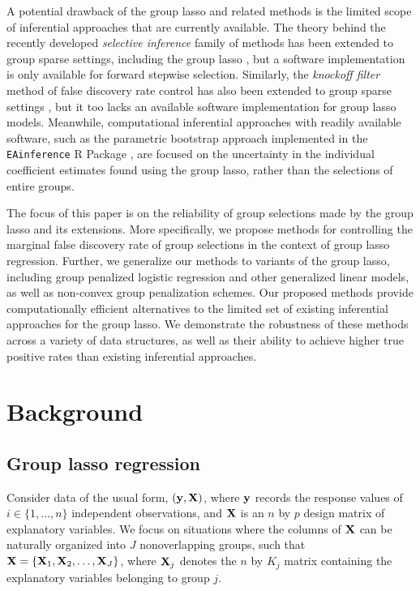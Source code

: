 A potential drawback of the group lasso and related methods is the limited scope of inferential approaches that are currently available. The theory behind the recently developed \textit{selective inference} \citep{Selective_Inference} family of methods has been extended to group sparse settings, including the group lasso \citep{Yang2016}, but a software implementation is only available for forward stepwise selection.  Similarly, the \textit{knockoff filter} method of false discovery rate control \citep{barber2015, candes2018} has also been extended to group sparse settings \citep{Dai2016}, but it too lacks an available software implementation for group lasso models.  Meanwhile, computational inferential approaches with readily available software, such as the parametric bootstrap approach implemented in the {\tt EAinference} R Package \citep{Zhou2017}, are focused on the uncertainty in the individual coefficient estimates found using the group lasso, rather than the selections of entire groups.

The focus of this paper is on the reliability of group selections made by the group lasso and its extensions.  More specifically, we propose methods for controlling the marginal false discovery rate of group selections in the context of group lasso regression.   Further, we generalize our methods to variants of the group lasso, including group penalized logistic regression and other generalized linear models, as well as non-convex group penalization schemes.  Our proposed methods provide computationally efficient alternatives to the limited set of existing inferential approaches for the group lasso.  We demonstrate the robustness of these methods across a variety of data structures, as well as their ability to achieve higher true positive rates than existing inferential approaches. 

\section{Background}

\subsection{Group lasso regression}

Consider data of the usual form, $(\mathbf{y}, \mathbf{X})$, where $\mathbf{y}$ records the response values of $i \in \{1, \ldots, n\}$ independent observations, and $\mathbf{X}$ is an $n$ by $p$ design matrix of explanatory variables.  We focus on situations where the columns of $\mathbf{X}$ can be naturally organized into $J$ nonoverlapping groups, such that $\mathbf{X} = \{\mathbf{X}_1, \mathbf{X}_2, \ldots, \mathbf{X}_J\}$, where $\mathbf{X}_j$ denotes the $n$ by $K_j$ matrix containing the explanatory variables belonging to group $j$.  

